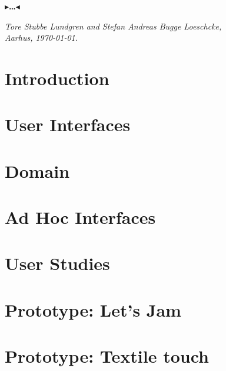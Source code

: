 \documentclass[oneside,11pt,openright]{report}
\newcommand{\todo}[1]{{\color[rgb]{.5,0,0}\textbf{$\blacktriangleright$#1$\blacktriangleleft$}}}
\begin{document}
{\todo{\dots}

\vspace{2ex}
\begin{flushright}
  \emph{Tore Stubbe Lundgren and Stefan Andreas Bugge Loeschcke,}\\
  \emph{Aarhus, \today.}
\end{flushright}

\tableofcontents
{}
\setcounter{secnumdepth}{2}



\chapter{Introduction}
\label{ch:intro}


\chapter{User Interfaces}
\label{ch:ui}


\chapter{Domain}
\label{ch:domain}


\chapter{Ad Hoc Interfaces}
\label{ch:adhoc}


\chapter{User Studies}
\label{ch:workshops}


\chapter{Prototype: Let's Jam}
\label{ch:jamming}


\chapter{Prototype: Textile touch}
\label{ch:textile-touch}


}
\end{document}
